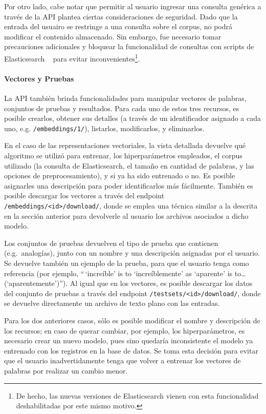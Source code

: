 Por otro lado, cabe notar que permitir al usuario ingresar una consulta genérica a través de la API
plantea ciertas consideraciones de seguridad. Dado que la entrada del usuairo se restringe a una
consulta sobre el corpus, no podrá modificar el contenido almacenado. Sin embargo, fue necesario
tomar precauciones adicionales y bloquear la funcionalidad de consultas con scripts de Elasticsearch
~\cite{ElasticsearchScripting} para evitar inconvenientes\footnote{De hecho, las nuevas versiones de
Elasticsearch vienen con esta funcionalidad deshabilitadas por este mismo motivo.}.


\paragraph{Vectores y Pruebas}

La API también brinda funcionalidades para manipular vectores de palabras, conjuntos de pruebas y
resultados. Para cada uno de estos tres recursos, es posible crearlos, obtener sus detalles (a
través de un identificador asignado a cada uno, e.g. \texttt{/embeddings/1/}), listarlos,
modificarlos, y eliminarlos.

En el caso de las representaciones vectoriales, la vista detallada devuelve qué algoritmo se utilizó
para entrenar, los hiperparámetros empleados, el corpus utilizado (la consulta de Elasticsearch, el
tamaño en cantidad de palabras, y las opciones de preprocesamiento), y si ya ha sido entrenado o
no. Es posible asignarles una descripción para poder identificarlos más fácilmente. También es
posible descargar los vectores a través del endpoint \texttt{/embeddings/<id>/download/}, donde se
emplea una técnica similar a la descrita en la sección anterior para devolverle al usuario los
archivos asociados a dicho modelo.

Los conjuntos de pruebas devuelven el tipo de prueba que contienen (e.g.\ analogías), junto con un
nombre y una descripción asignadas por el usuario. Se devuelve también un ejemplo de la prueba, para
que el usuario tenga como referencia (por ejemplo, ``\,`increíble' is to `increíblemente' as
`aparente' is to\ldots (`aparentemente')''). Al igual que en los vectores, es posible descargar los
datos del conjunto de pruebas a través del endpoint \texttt{/testsets/<id>/download/}, donde se
devuelve directamente un archivo de texto plano con las entradas.

Para los dos anteriores casos, sólo es posible modificar el nombre y descripción de los recursos; en
caso de querar cambiar, por ejemplo, los hiperparámetros, es necesario crear un nuevo modelo, pues
sino quedaría inconsistente el modelo ya entrenado con los registros en la base de datos. Se toma
esta decisión para evitar que el usuario inadvertidamente tenga que volver a entrenar los vectores
de palabras por realizar un cambio menor.

